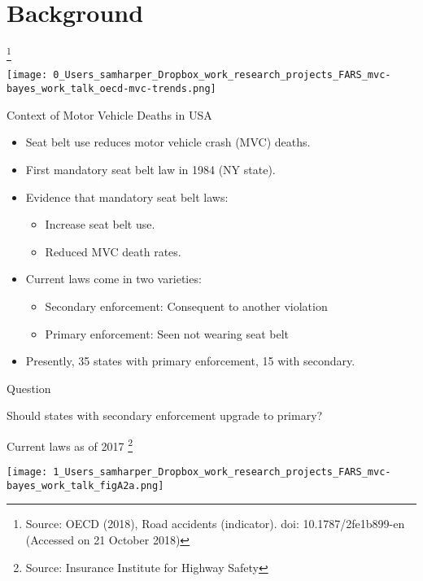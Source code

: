 \documentclass[english]{beamer}\usepackage[]{graphicx}\usepackage[]{color}
\begin{document}
\section{Background}
\begin{frame}[plain]{}

\footnote{{\tiny{}Source: OECD (2018), Road accidents (indicator). doi: 10.1787/2fe1b899-en
(Accessed on 21 October 2018)}}
\begin{center}
\texttt{[image: 0\_Users\_samharper\_Dropbox\_work\_research\_projects\_FARS\_mvc-bayes\_work\_talk\_oecd-mvc-trends.png]}
\par\end{center}

\end{frame}
%
\begin{frame}{Context of Motor Vehicle Deaths in USA}
\begin{itemize}
\item Seat belt use reduces motor vehicle crash (MVC) deaths.\medskip{}
\item<2-> First mandatory seat belt law in 1984 (NY state).\medskip{}
\item<3-> Evidence that mandatory seat belt laws:
\begin{itemize}
\item Increase seat belt use.
\item Reduced MVC death rates.\medskip{}
\end{itemize}
\item<4-> Current laws come in two varieties:
\begin{itemize}
\item Secondary enforcement: Consequent to another violation
\item Primary enforcement: Seen not wearing seat belt
\end{itemize}
\medskip{}

\item<5-> Presently, 35 states with primary enforcement, 15 with secondary.
\end{itemize}
\end{frame}
%
\begin{frame}[plain]{}
\begin{alertblock}{Question}

Should states with secondary enforcement upgrade to primary?
\end{alertblock}
\end{frame}
%
\begin{frame}{Current laws as of 2017}
\footnote{{\tiny{}Source: Insurance Institute for Highway Safety}}
\begin{center}
\texttt{[image: 1\_Users\_samharper\_Dropbox\_work\_research\_projects\_FARS\_mvc-bayes\_work\_talk\_figA2a.png]}
\par\end{center}

\end{frame}
\end{document}
